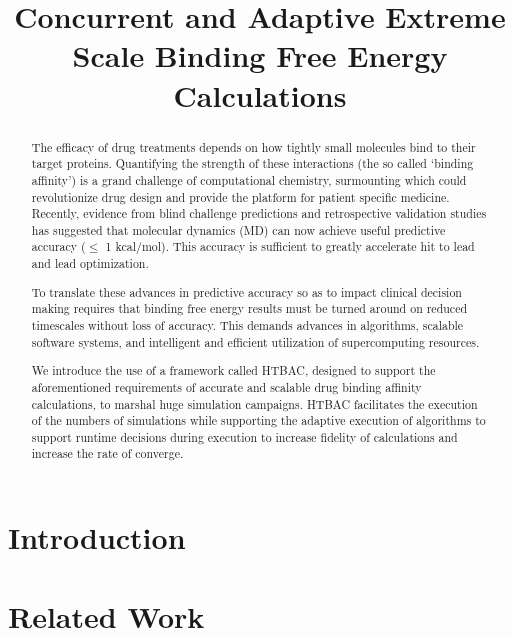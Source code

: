 \documentclass[conference]{IEEEtran}
\title{Concurrent and Adaptive Extreme Scale Binding Free Energy
Calculations}
\author{
\IEEEauthorblockN{}
\IEEEauthorblockA{RADICAL Laboratory, Electrical and Computer Engineering,
                    Rutgers University, New Brunswick, NJ, USA}
}
\begin{document}
\maketitle

\begin{abstract}
The efficacy of drug treatments depends on how tightly small molecules bind
to their target proteins. Quantifying the strength of these interactions (the
so called ‘binding affinity’) is a grand challenge of computational
chemistry, surmounting which could revolutionize drug design and provide the
platform for patient specific medicine. Recently, evidence from blind
challenge predictions and retrospective validation studies has suggested that
molecular dynamics (MD) can now achieve useful predictive accuracy ($\leq$ 1
kcal/mol). This accuracy is sufficient to greatly accelerate hit to lead and
lead optimization.

To translate these advances in predictive accuracy so as to impact clinical
decision making requires that binding free energy results must be turned
around on reduced timescales without loss of accuracy. This demands advances
in algorithms, scalable software systems, and intelligent and efficient
utilization of supercomputing resources.

We introduce the use of a framework called HTBAC, designed to support the
aforementioned requirements of accurate and scalable drug binding affinity
calculations, to marshal huge simulation campaigns. HTBAC facilitates the
execution of the numbers of simulations while supporting the adaptive
execution of algorithms to support runtime decisions during execution to 
increase fidelity of calculations and increase the rate of converge.
\end{abstract}


\section{Introduction}\label{sec:intro}



\section{Related Work}\label{sec:related-work}

\end{document}
